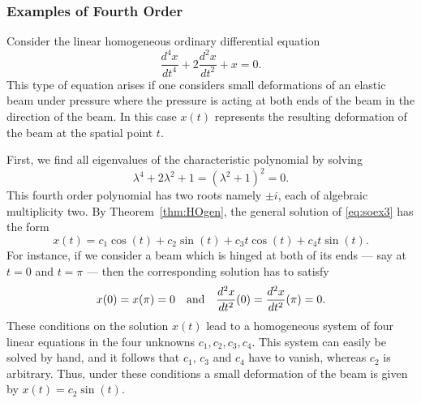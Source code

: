\documentclass{ximera}
\begin{document}
\subsubsection*{Examples of Fourth Order}

Consider the linear homogeneous ordinary differential equation
\begin{equation}  \label{eq:soex3}
\frac{d^4x}{dt^4} + 2\frac{d^2x}{dt^2} + x= 0.
\end{equation}
This type of equation arises if one considers small deformations of
an elastic beam under pressure where the pressure is acting at both
ends of the beam in the direction of the beam.  In this case $x(t)$
represents the resulting deformation of the beam at the spatial point $t$.

First, we find all eigenvalues of the characteristic polynomial by solving
\[
\lambda^4 + 2\lambda^2 + 1 = (\lambda^2+1)^2 = 0.
\]
This fourth order polynomial has two roots namely $\pm i$, each of
algebraic multiplicity two.  By Theorem~\ref{thm:HOgen}, the general solution 
of \eqref{eq:soex3} has the form
\[
x(t) = c_1 \cos(t)+ c_2 \sin(t) +c_3 t\cos(t)+ c_4 t\sin(t).
\]
For instance, if we consider a beam which is hinged at both of its ends ---
say at $t=0$ and $t=\pi$ --- then the corresponding solution has to satisfy
\[
x(0)=x(\pi)=0 \quad\mbox{and}\quad \frac{d^2x}{dt^2}(0)=\frac{d^2x}{dt^2}(\pi)=0.
\]
These conditions on the solution $x(t)$ lead to a homogeneous system of four
linear equations in the four unknowns $c_1,c_2,c_3,c_4$.  This system can
easily be solved by hand, and it follows that $c_1$, $c_3$ and $c_4$ have
to vanish, whereas $c_2$ is arbitrary.  Thus, under these conditions a
small deformation of the beam is given by $x(t)=c_2 \sin(t)$.
\end{document}
